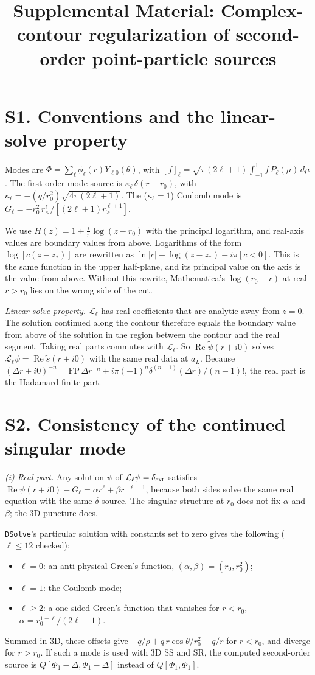 \documentclass[aps,prl,onecolumn,superscriptaddress,nofootinbib,floatfix]{revtex4-2}
\renewcommand{\Re}{\operatorname{Re}}
\newcommand{\dext}{\delta_{\rm ext}}
\newcommand{\Lop}{\mathcal{L}_\ell}
\begin{document}
\title{Supplemental Material: Complex-contour regularization of second-order point-particle sources}
\maketitle

\section{S1. Conventions and the linear-solve property}
Modes are $\Phi=\sum_\ell\phi_\ell(r)Y_{\ell0}(\theta)$, with $[f]_\ell=\sqrt{\pi(2\ell+1)}\int_{-1}^1 f\,P_\ell(\mu)\,d\mu$.
The first-order mode source is $\kappa_\ell\,\delta(r-r_0)$, with $\kappa_\ell=-(q/r_0^2)\sqrt{4\pi(2\ell+1)}$.
The ($\kappa_\ell=1$) Coulomb mode is $G_\ell=-r_0^2\,r_<^\ell/[(2\ell+1)r_>^{\ell+1}]$.

We use $H(z)=1+\tfrac{i}{\pi}\log(z-r_0)$ with the principal logarithm, and real-axis values are boundary values from above.
Logarithms of the form $\log[c(z-z_*)]$ are rewritten as $\ln|c|+\log(z-z_*)-i\pi[c<0]$.
This is the same function in the upper half-plane, and its principal value on the axis is the value from above.
Without this rewrite, Mathematica's $\log(r_0-r)$ at real $r>r_0$ lies on the wrong side of the cut.

\emph{Linear-solve property.}
$\Lop$ has real coefficients that are analytic away from $z=0$.
The solution continued along the contour therefore equals the boundary value from above of the solution in the region between the contour and the real segment.
Taking real parts commutes with $\Lop$.
So $\Re\tilde\psi(r+i0)$ solves $\Lop\psi=\Re\tilde s(r+i0)$ with the same real data at $a_L$.
Because $(\Delta r+i0)^{-n}=\mathrm{FP}\,\Delta r^{-n}+i\pi(-1)^n\delta^{(n-1)}(\Delta r)/(n-1)!$, the real part is the Hadamard finite part.

\section{S2. Consistency of the continued singular mode}
\emph{(i) Real part.}
Any solution $\psi$ of $\Lop\psi=\dext$ satisfies $\Re\psi(r+i0)-G_\ell=\alpha r^\ell+\beta r^{-\ell-1}$, because both sides solve the same real equation with the same $\delta$ source.
The singular structure at $r_0$ does not fix $\alpha$ and $\beta$; the 3D puncture does.

\texttt{DSolve}'s particular solution with constants set to zero gives the following ($\ell\le12$ checked):
\begin{itemize}
\item $\ell=0$: an anti-physical Green's function, $(\alpha,\beta)=(r_0,r_0^2)$;
\item $\ell=1$: the Coulomb mode;
\item $\ell\ge2$: a one-sided Green's function that vanishes for $r<r_0$, $\alpha=r_0^{1-\ell}/(2\ell+1)$.
\end{itemize}
Summed in 3D, these offsets give $-q/\rho+q\,r\cos\theta/r_0^2-q/r$ for $r<r_0$, and diverge for $r>r_0$.
If such a mode is used with 3D SS and SR, the computed second-order source is $Q[\Phi_1-\Delta,\Phi_1-\Delta]$ instead of $Q[\Phi_1,\Phi_1]$.
\end{document}
